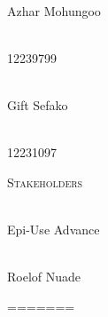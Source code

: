 \begin{titlepage}
\begin{center}
		
		\begin{minipage}{0.4\textwidth}
			\begin{flushleft} \large
				\emph{} \\
				Azhar {Mohungoo }
			\end{flushleft}
		\end{minipage}
		\begin{minipage}{0.4\textwidth}
			\begin{flushright} \large
				\emph{} \\
				12239799
			\end{flushright}
		\end{minipage}
		
		
		\begin{minipage}{0.4\textwidth}
			\begin{flushleft} \large
				\emph{} \\
				Gift {Sefako }
			\end{flushleft}
		\end{minipage}
		\begin{minipage}{0.4\textwidth}
			\begin{flushright} \large
				\emph{} \\
				12231097
			\end{flushright}
		\end{minipage}
		
		\textsc{\Large Stakeholders}\\[1cm]	
				
		\begin{minipage}{0.4\textwidth}
			\begin{flushleft} \large
				\emph{} \\
				Epi-Use Advance
			\end{flushleft}
		\end{minipage}
		\begin{minipage}{0.4\textwidth}
			\begin{flushright} \large
				\emph{} \\
				Roelof Nuade
			\end{flushright}
		\end{minipage}
		
	\end{center}
=======
\begin{titlepage}
	

\end{titlepage}
\end{titlepage}
